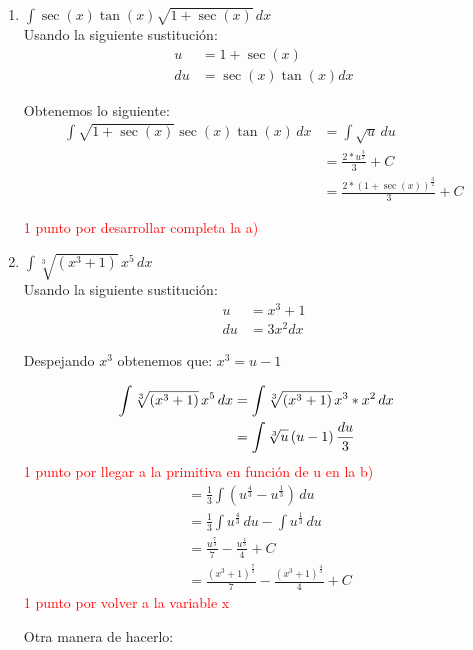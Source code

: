 \documentclass[a4paper,10pt]{article}
\newcommand{\dis}{\displaystyle}
\begin{document}
\begin{enumerate}[label=\emph{\alph*)}]
\item $\dis \int \sec(x) \tan(x)\sqrt{1+\sec(x)}\, dx$\\

Usando la siguiente sustitución:
\begin{align*}
u &= 1+\sec(x) \\
du &= \sec(x) \tan(x) dx
\end{align*}

Obtenemos lo siguiente:
\begin{align*}
 \dis \int \sqrt{1+\sec(x)} \sec(x) \tan(x)\, dx &= \dis \int \sqrt{u} \, du \\
      &=  \frac{2*u^{\frac{3}{2}}}{3} + C\\
       &=  \frac{2*{(1+\sec(x))}^{\frac{3}{2}}}{3} + C
\end{align*}

\textcolor{red}{1 punto por desarrollar completa la a)}

\item $\dis \int \sqrt[3]{(x^3+1)}\, x^5\, dx$\\
Usando la siguiente sustitución:
\begin{align*}
u &= x^3+1 \\
du &= 3x^2 dx
\end{align*}

Despejando $x^3$ obtenemos que: $x^3 = u - 1$

\begin{align*}
 \dis \dis \int \sqrt[3]{(x^3+1)}\, x^5\, dx &= \dis \int \sqrt[3]{(x^3+1)}\, x^3* x^2\, dx \\
      &=  \dis \int \sqrt[3]{u}\, (u-1)\, \frac{du}{3} & \\
 \end{align*}
 \textcolor{red}{1 punto por llegar a la primitiva en función de u en la b)}
 \begin{align*}
       &=  \frac{1}{3}\int (u^{\frac{4}{3}} - u^{\frac{1}{3}}) \, du\\
       &=  \frac{1}{3}\int u^{\frac{4}{3}}\, du - \int u^{\frac{1}{3}} \, du\\
 	   &=   \frac{u^{\frac{7}{3}}}{7}  - \frac{u^{\frac{4}{3}}}{4} + C\\
       &=   \frac{{(x^3+1)}^{\frac{7}{3}}}{7}  - \frac{{(x^3+1)}^{\frac{4}{3}}}{4} + C
\end{align*}
\textcolor{red}{1 punto por volver a la variable x}

Otra manera de hacerlo:


\end{enumerate}
\end{document}
